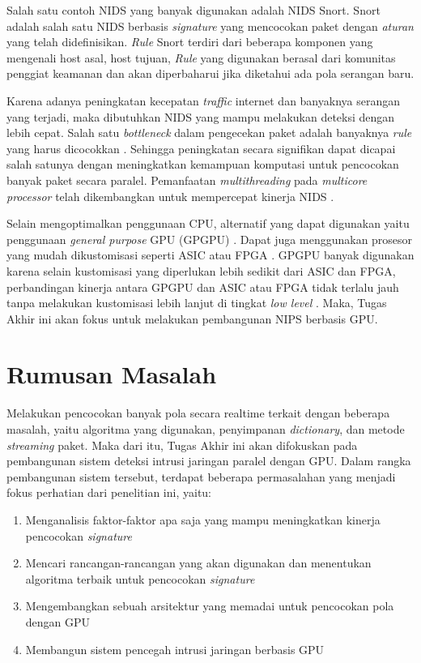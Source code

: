   Salah satu contoh NIDS yang banyak digunakan adalah NIDS Snort. Snort adalah salah satu NIDS berbasis \emph{signature} yang mencocokan paket dengan \emph{aturan} yang telah didefinisikan. \emph{Rule} Snort terdiri dari beberapa komponen yang mengenali host asal, host tujuan,  \emph{Rule} yang digunakan berasal dari komunitas penggiat keamanan dan akan diperbaharui jika diketahui ada pola serangan baru.

  Karena adanya peningkatan kecepatan \emph{traffic} internet dan banyaknya serangan yang terjadi, maka dibutuhkan NIDS yang mampu melakukan deteksi dengan lebih cepat. Salah satu \emph{bottleneck} dalam pengecekan paket adalah banyaknya \emph{rule} yang harus dicocokkan \citep{pcre2007}. Sehingga peningkatan secara signifikan dapat dicapai salah satunya dengan meningkatkan kemampuan komputasi untuk pencocokan banyak paket secara paralel. Pemanfaatan \emph{multithreading} pada \emph{multicore processor} telah dikembangkan untuk mempercepat kinerja NIDS \citep{multi2004}.

  Selain mengoptimalkan penggunaan CPU, alternatif yang dapat digunakan yaitu penggunaan \emph{general purpose} GPU (GPGPU) \citep{4482891}. Dapat juga menggunakan prosesor yang mudah dikustomisasi seperti ASIC atau FPGA \citep{fpga2008}. GPGPU banyak digunakan karena selain kustomisasi yang diperlukan lebih sedikit dari ASIC dan FPGA, perbandingan kinerja antara GPGPU dan ASIC atau FPGA tidak terlalu jauh tanpa melakukan kustomisasi lebih lanjut di tingkat \emph{low level} \citep{gnort2008}. Maka, Tugas Akhir ini akan fokus untuk melakukan pembangunan NIPS berbasis GPU.

\section{Rumusan Masalah}

  Melakukan pencocokan banyak pola secara realtime terkait dengan beberapa masalah, yaitu algoritma yang digunakan, penyimpanan \emph{dictionary}, dan metode \emph{streaming} paket. Maka dari itu, Tugas Akhir ini akan difokuskan pada pembangunan sistem deteksi intrusi jaringan paralel dengan GPU. Dalam rangka pembangunan sistem tersebut, terdapat beberapa permasalahan yang menjadi fokus perhatian dari penelitian ini, yaitu: \\
  \begin{enumerate}
      \item Menganalisis faktor-faktor apa saja yang mampu meningkatkan kinerja pencocokan \emph{signature}
      \item Mencari rancangan-rancangan yang akan digunakan dan menentukan algoritma terbaik untuk pencocokan \emph{signature}
      \item Mengembangkan sebuah arsitektur yang memadai untuk pencocokan pola dengan GPU
      \item Membangun sistem pencegah intrusi jaringan berbasis GPU
  \end{enumerate}

